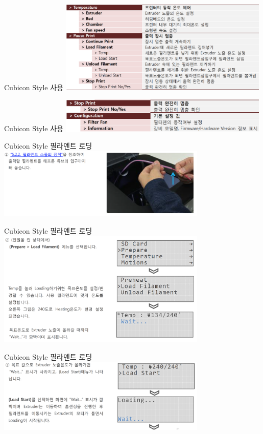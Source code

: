 \documentclass[11pt]{beamer}
\begin{document}
\begin{frame}[t]{Cubicon Style 사용}\footnotesize
	\centering
	\includegraphics[width=10cm]{./image/18_14.png}
\end{frame}

\begin{frame}[t]{Cubicon Style 사용}\footnotesize
	\centering
	\includegraphics[width=10cm]{./image/18_15.png}
\end{frame}

\begin{frame}[t]{Cubicon Style 필라멘트 로딩}\footnotesize
	\centering
	\includegraphics[width=10cm]{./image/18_16.png}
\end{frame}

\begin{frame}[t]{Cubicon Style 필라멘트 로딩}\footnotesize
	\centering
	\includegraphics[width=10cm]{./image/18_17.png}
\end{frame}

\begin{frame}[t]{Cubicon Style 필라멘트 로딩}\footnotesize
	\centering
	\includegraphics[width=10cm]{./image/18_18.png}
\end{frame}
\end{document}
